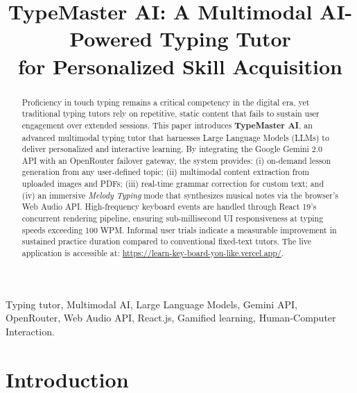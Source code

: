 \documentclass[conference]{IEEEtran}
\begin{document}
\title{TypeMaster AI: A Multimodal AI-Powered Typing Tutor\\for Personalized Skill Acquisition}

\author{
}

\maketitle

\begin{abstract}
Proficiency in touch typing remains a critical competency in the
digital era, yet traditional typing tutors rely on repetitive, static
content that fails to sustain user engagement over extended sessions.
This paper introduces \textbf{TypeMaster AI}, an advanced multimodal
typing tutor that harnesses Large Language Models (LLMs) to deliver
personalized and interactive learning. By integrating the Google
Gemini 2.0 API with an OpenRouter failover gateway, the system
provides: (i) on-demand lesson generation from any user-defined
topic; (ii) multimodal content extraction from uploaded images and
PDFs; (iii) real-time grammar correction for custom text; and (iv)
an immersive \emph{Melody Typing} mode that synthesizes musical
notes via the browser's Web Audio API. High-frequency keyboard events
are handled through React 19's concurrent rendering pipeline,
ensuring sub-millisecond UI responsiveness at typing speeds exceeding
100 WPM. Informal user trials indicate a measurable improvement in
sustained practice duration compared to conventional fixed-text
tutors. The live application is accessible at:
\url{https://learn-key-board-you-like.vercel.app/}.
\end{abstract}

\begin{IEEEkeywords}
Typing tutor, Multimodal AI, Large Language Models, Gemini API,
OpenRouter, Web Audio API, React.js, Gamified learning,
Human-Computer Interaction.
\end{IEEEkeywords}

\section{Introduction}
\end{document}
